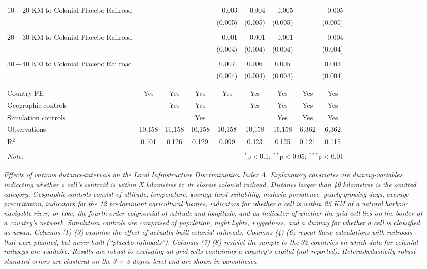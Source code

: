 \documentclass[11pt, oneside]{article}   	%
\newcommand{\mysubcaption}[1]{
\justify
\begin{spacing}{0.7}
\textit{\footnotesize #1}
\end{spacing}}
\begin{document}
\begin{table}[t]
{\begin{tabular}{@{\extracolsep{5pt}}lcccccccc}
   $10-20$ KM to Colonial Placebo Railroad &  &  &  & $-$0.003 & $-$0.004 & $-$0.005 &  & $-$0.005 \\
  &  &  &  & (0.005) & (0.005) & (0.005) &  & (0.005) \\
    & & & & & & & & \\
   $20-30$ KM to Colonial Placebo Railroad &  &  &  & $-$0.001 & $-$0.001 & $-$0.001 &  & $-$0.004 \\
  &  &  &  & (0.004) & (0.004) & (0.004) &  & (0.004) \\
    & & & & & & & & \\
   $30-40$ KM to Colonial Placebo Railroad &  &  &  & 0.007 & 0.006 & 0.005 &  & 0.003 \\
  &  &  &  & (0.004) & (0.004) & (0.004) &  & (0.004) \\
    & & & & & & & & \\
  \hline \\[-1.8ex]
  Country FE & Yes & Yes & Yes & Yes & Yes & Yes & Yes & Yes \\
  Geographic controls &  & Yes & Yes &  & Yes & Yes & Yes & Yes \\
  Simulation controls &  &  & Yes &  &  & Yes & Yes & Yes \\
  Observations & 10,158 & 10,158 & 10,158 & 10,158 & 10,158 & 10,158 & 6,362 & 6,362 \\
  R$^{2}$ & 0.101 & 0.126 & 0.129 & 0.099 & 0.123 & 0.125 & 0.121 & 0.115 \\
  \hline
  \hline \\[-1.8ex]
  \textit{Note:}  & \multicolumn{8}{r}{$^{*}$p$<$0.1; $^{**}$p$<$0.05; $^{***}$p$<$0.01} \\
  \end{tabular}

}

\mysubcaption{Effects of various distance-intervals on the Local Infrastructure Discrimination Index $\Lambda$. Explanatory covariates are dummy-variables indicating whether a cell's centroid is within X kilometres to its closest colonial railroad. Distance larger than 40 kilometres is the omitted category. Geographic controls consist of altitude, temperature, average land suitability, malaria prevalence, yearly growing days, average precipitation, indicators for the 12 predominant agricultural biomes, indicators for whether a cell is within 25 KM of a natural harbour, navigable river, or lake, the fourth-order polynomial of latitude and longitude, and an indicator of whether the grid cell lies on the border of a country's network. Simulation controls are comprised of population, night lights, ruggedness, and a dummy for whether a cell is classified as urban. Columns (1)-(3) examine the effect of actually built colonial railroads. Columns (4)-(6) repeat these calculations with railroads that were planned, but never built (``placebo railroads''). Columns (7)-(8) restrict the sample to the 32 countries on which data for colonial railways are available. Results are robust to excluding all grid cells containing a country's capital (not reported). Heteroskedasticity-robust standard errors are clustered on the 3 $\times$ 3 degree level and are shown in parentheses.}
\end{table}
\end{document}
